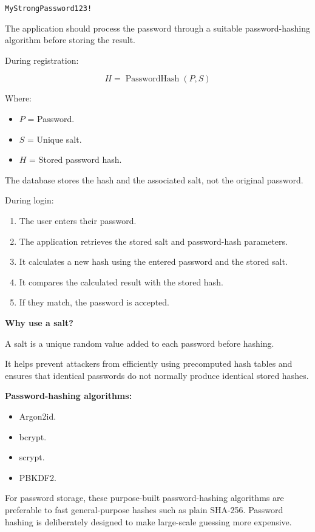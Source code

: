 \texttt{MyStrongPassword123!}

The application should process the password through a suitable password-hashing algorithm before storing the result.

During registration:



\[
H=\operatorname{PasswordHash}(P,S)
\]



Where:

\begin{itemize}
\item $P$ = Password.
\item $S$ = Unique salt.
\item $H$ = Stored password hash.
\end{itemize}

The database stores the hash and the associated salt, not the original password.

During login:

\begin{enumerate}
\item The user enters their password.
\item The application retrieves the stored salt and password-hash parameters.
\item It calculates a new hash using the entered password and the stored salt.
\item It compares the calculated result with the stored hash.
\item If they match, the password is accepted.
\end{enumerate}

\textbf{Why use a salt?}

A salt is a unique random value added to each password before hashing.

It helps prevent attackers from efficiently using precomputed hash tables and ensures that identical passwords do not normally produce identical stored hashes.

\textbf{Password-hashing algorithms:}

\begin{itemize}
\item Argon2id.
\item bcrypt.
\item scrypt.
\item PBKDF2.
\end{itemize}

For password storage, these purpose-built password-hashing algorithms are preferable to fast general-purpose hashes such as plain SHA-256. Password hashing is deliberately designed to make large-scale guessing more expensive.


